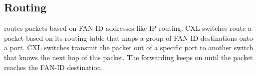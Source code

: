 


\subsection{Routing}

\aurelia routes packets based on FAN-ID addresses like IP routing.
%
CXL switches route a packet based on its routing table that maps a group of FAN-ID destinations onto a port. 
%
CXL switches transmit the packet out of a specific port to another switch that knows the next hop of this packet. 
%
The forwarding keeps on until the packet reaches the FAN-ID destination.

